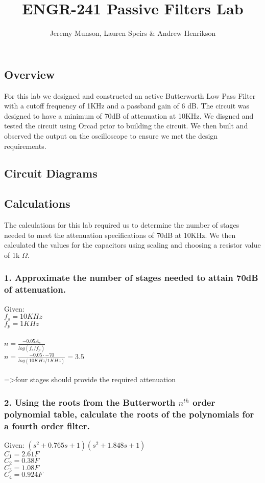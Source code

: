 \documentclass[11pt]{article}
\title{ENGR-241 Passive Filters Lab}
\author{Jeremy Munson, Lauren Speirs \& Andrew Henrikson}
\begin{document}
	\maketitle
	\subsection*{Overview}
	For this lab we designed and  constructed an active Butterworth Low Pass Filter with a cutoff frequency of 1KHz and a passband gain of 6 dB. The circuit was designed to have a minimum of 70dB of attenuation at 10KHz. We disgned and tested the circuit using Orcad prior to building the circuit. We then built and observed the output on the oscilloscope to ensure we met the design requirements.
	\subsection*{Circuit Diagrams}
	
	\subsection*{Calculations}
	The calculations for this lab required us to determine the number of stages needed to meet the attenuation specifications of 70dB at 10KHz. We then calculated the values for the capacitors using scaling and choosing a resistor value of 1k $\Omega$.
	\subsubsection*{1. Approximate the number of stages needed to attain 70dB of attenuation.}
	Given:\\
	$f_{s}=10KHz$\\
	$f_{p}=1KHz$\\\\
	$n=\frac{-0.05A_{s}}{log(f_{s}/f_{p})}$\\
	$n=\frac{-0.05\cdot -70}{log(10KHz/1KHz)}=3.5$\\\\
	=>four stages should provide the required attenuation
	\subsubsection*{2. Using the roots from the Butterworth $n^{th}$ order polynomial table, calculate the roots of the polynomials for a fourth order filter.}
	Given:
	$(s^{2}+0.765s+1)(s^{2}+1.848s+1)$\\
	$C_{1}=2.61F$\\
	$C_{2}=0.38F$\\
	$C_{3}=1.08F$\\
	$C_{4}=0.924F$\\
\end{document}

